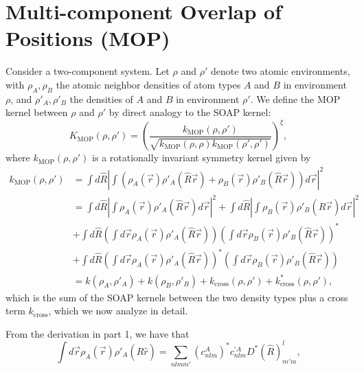 \documentclass[%
preprint,
amsmath,amssymb,
aps,
]{revtex4-1}
\begin{document}
\section{Multi-component Overlap of Positions (MOP)}

Consider a two-component system. Let $\rho$ and $\rho'$ denote two atomic environments, with $\rho_A, \rho_B$ the atomic neighbor densities of atom types $A$ and $B$ in environment $\rho$, and $\rho'_A, \rho'_B$ the densities of $A$ and $B$ in environment $\rho'$. We define the MOP kernel between $\rho$ and $\rho'$ by direct analogy to the SOAP kernel:
\begin{equation}
    K_{\text{MOP}}(\rho, \rho') = \left(\frac{k_{\text{MOP}} (\rho, \rho')}{\sqrt{k_{\text{MOP}}(\rho, \rho) k_{\text{MOP}}(\rho', \rho')}} \right) ^{\xi},
\end{equation}
where $k_{\text{MOP}}(\rho, \rho')$ is a rotationally invariant symmetry kernel given by
\begin{equation}
    \begin{split}
    k_{\text{MOP}}(\rho, \rho') &= \int d\hat{R} \left| \int \left( \rho_A(\vec{r}) \rho'_A(\hat{R}\vec{r}) + \rho_B(\vec{r}) \rho'_B(\hat{R}\vec{r}) \right) d\vec{r} \right| ^2 \\
    &= \int d\hat{R} \left| \int \rho_A(\vec{r}) \rho'_A(\hat{R}\vec{r}) d\vec{r} \right|^2 + \int d\hat{R} \left| \int \rho_B(\vec{r}) \rho'_B(\hat{R}\vec{r}) d\vec{r} \right|^2 \\
    &+ \int d \hat{R} \left( \int d\vec{r} \rho_A(\vec{r}) \rho'_A(\hat{R} \vec{r}) \right) \left( \int d\vec{r} \rho_B(\vec{r}) \rho'_B(\hat{R} \vec{r}) \right)^* \\
    &+ \int d \hat{R} \left( \int d\vec{r} \rho_A(\vec{r}) \rho'_A(\hat{R} \vec{r}) \right)^* \left( \int d\vec{r} \rho_B(\vec{r}) \rho'_B(\hat{R} \vec{r}) \right) \\
    &= k(\rho_A, \rho'_A) + k(\rho_B, \rho'_B) + k_{\text{cross}}(\rho, \rho') + k_{\text{cross}}^*(\rho, \rho'),
    \end{split}
\end{equation}
which is the sum of the SOAP kernels between the two density types plus a cross term $k_{\text{cross}}$, which we now analyze in detail.

From the derivation in part 1, we have that
\begin{equation}
\int d\vec{r} \rho_A(\vec{r}) \rho'_A(\hat{R}\hat{r}) = \sum_{n l m m'} (c_{n l m}^A)^* c_{n l m}^{'A} D^* (\hat{R})^l_{m' m},
\end{equation}
\end{document}
